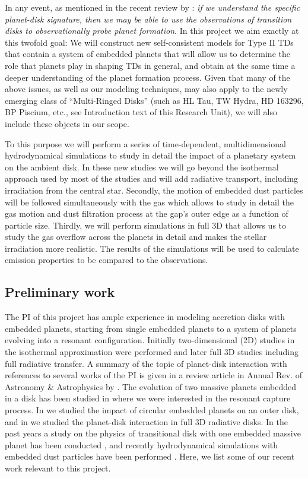 \documentclass[10pt,fleqn,twoside]{article}
\begin{document}
In any event, as mentioned in the recent review by \citep{2016PASA...33....5O}: 
{\it if we understand the specific planet-disk signature, then we may be able to
use the observations of transition disks to observationally probe planet formation}.
In this project we aim exactly at this twofold goal: We will construct new self-consistent models 
for Type II TDs that contain a system of embedded planets that will allow us to determine
the role that planets play in shaping TDs in general, and obtain at the same time a deeper understanding of the planet
formation process.
Given that many of the above issues, as well as our modeling techniques, 
may also apply to the newly emerging class of ``Multi-Ringed Disks'' (such as HL Tau,
TW Hydra, HD 163296, BP Piscium, etc., see Introduction text of this Research
Unit), we will also include these objects in our scope.

To this purpose we will perform a series of time-dependent, multidimensional hydrodynamical 
simulations to study in detail the impact of a planetary system on the ambient disk. 
In these new studies we will go beyond the isothermal approach used
by most of the studies and will add radiative transport, including irradiation from the central star.
Secondly, the motion of embedded dust particles will be followed simultaneously with the gas
which allows to study in detail the gas motion and dust filtration process at the gap's outer edge as a function
of particle size. Thirdly, we will perform simulations in full 3D that allows us to study the gas overflow
across the planets in detail and makes the stellar irradiation more realistic. 
The results of the simulations will be used to calculate emission properties to be compared to the observations.

\subsection{Preliminary work}
The PI of this project has ample experience in modeling accretion disks with embedded planets, starting from single
embedded planets to a system of planets evolving into a resonant configuration. Initially two-dimensional (2D) studies
in the isothermal approximation were performed and later full 3D studies including full radiative transfer. 
A summary of the topic of planet-disk interaction with references to several works of the PI is given in a review
article in Annual Rev. of Astronomy \& Astrophysics by \citet{2012ARA&A..50..211K}.
The evolution of two massive planets embedded in a disk has been studied in \citet{2004A&A...414..735K} where
we were interested in the resonant capture process. In \citet{2006A&A...447..369K} we
studied the impact of circular embedded planets on an outer disk, and in
\citet{2009A&A...506..971K} we studied the planet-disk interaction in full 3D radiative disks. 
In the past years a study on the physics of transitional disk 
with one embedded massive planet has been conducted \citet{2013A&A...560A..40M},
and recently hydrodynamical simulations with embedded dust particles have 
been performed \citet{2015A&A...584A.110P,2016A&A...594A..57S}. 
Here, we list some of our recent work relevant to this project.
\end{document}
